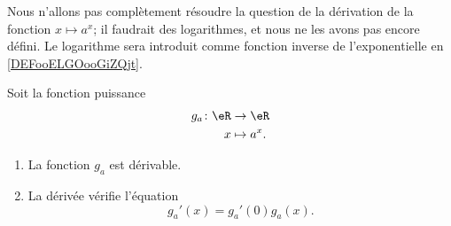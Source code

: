 Nous n'allons pas complètement résoudre la question de la dérivation de la fonction \( x\mapsto a^x\); il faudrait des logarithmes, et nous ne les avons pas encore défini. Le logarithme sera introduit comme fonction inverse de l'exponentielle en \ref{DEFooELGOooGiZQjt}.

\begin{proposition}       \label{PROPooMXCDooBffXbl}
	Soit la fonction puissance
	\begin{equation}
		\begin{aligned}
			g_a\colon \eR & \to \eR      \\
			x             & \mapsto a^x.
		\end{aligned}
	\end{equation}
	\begin{enumerate}
		\item
		      La fonction \( g_a\) est dérivable.
		\item
		      La dérivée vérifie l'équation
		      \begin{equation}        \label{EQooNIUJooPqDnax}
			      g_a'(x)=g_a'(0)g_a(x).
		      \end{equation}
	\end{enumerate}
\end{proposition}

